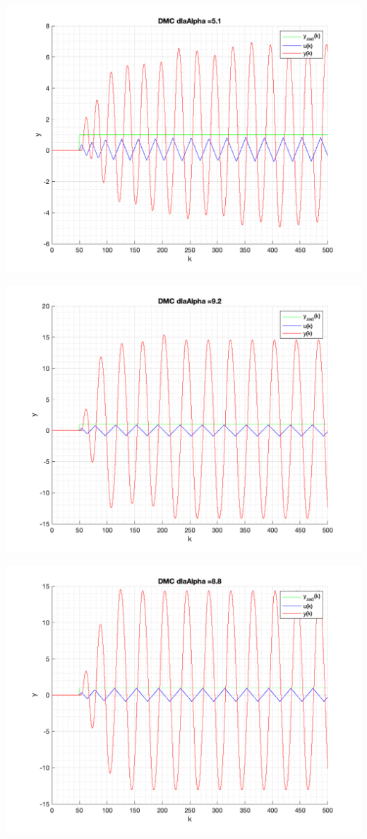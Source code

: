 \documentclass[a4paper, 11pt]{article}
\begin{document}
\begin{enumerate}
 \includegraphics[width=\linewidth]{./ModelsDodatkowe_Alpha/P4_DMC_Alpha_5_1_png.png} 
 
 \includegraphics[width=\linewidth]{./ModelsDodatkowe_Alpha/P4_DMC_Alpha_9_2_png.png} 
 
 \includegraphics[width=\linewidth]{./ModelsDodatkowe_Alpha/P4_DMC_Alpha_8_8_png.png} 
 

\end{enumerate}
\end{document}
